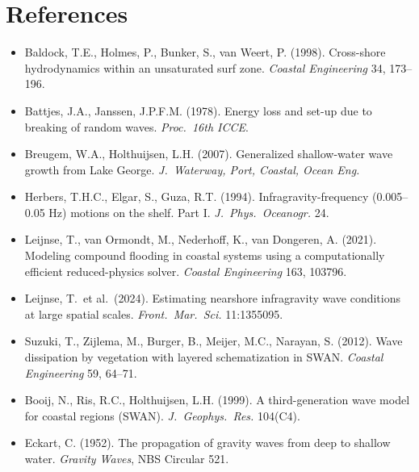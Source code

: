 \documentclass[11pt,a4paper]{article}
\begin{document}
\section*{References}
\begin{itemize}
  \item Baldock, T.E., Holmes, P., Bunker, S., van Weert, P. (1998).
  Cross-shore hydrodynamics within an unsaturated surf zone. \emph{Coastal
  Engineering} 34, 173--196.
  \item Battjes, J.A., Janssen, J.P.F.M. (1978). Energy loss and set-up due to
  breaking of random waves. \emph{Proc.\ 16th ICCE}.
  \item Breugem, W.A., Holthuijsen, L.H. (2007). Generalized shallow-water wave
  growth from Lake George. \emph{J.\ Waterway, Port, Coastal, Ocean Eng.}
  \item Herbers, T.H.C., Elgar, S., Guza, R.T. (1994). Infragravity-frequency
  (0.005--0.05 Hz) motions on the shelf. Part I. \emph{J.\ Phys.\ Oceanogr.} 24.
  \item Leijnse, T., van Ormondt, M., Nederhoff, K., van Dongeren, A. (2021).
  Modeling compound flooding in coastal systems using a computationally
  efficient reduced-physics solver. \emph{Coastal Engineering} 163, 103796.
  \item Leijnse, T.\ et al.\ (2024). Estimating nearshore infragravity wave
  conditions at large spatial scales. \emph{Front.\ Mar.\ Sci.} 11:1355095.
  \item Suzuki, T., Zijlema, M., Burger, B., Meijer, M.C., Narayan, S. (2012).
  Wave dissipation by vegetation with layered schematization in SWAN.
  \emph{Coastal Engineering} 59, 64--71.
  \item Booij, N., Ris, R.C., Holthuijsen, L.H. (1999). A third-generation wave
  model for coastal regions (SWAN). \emph{J.\ Geophys.\ Res.} 104(C4).
  \item Eckart, C. (1952). The propagation of gravity waves from deep to shallow
  water. \emph{Gravity Waves}, NBS Circular 521.
\end{itemize}
\end{document}
